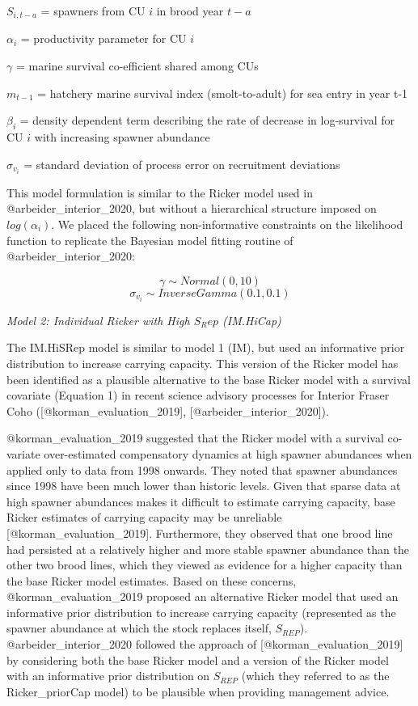 \documentclass[
]{article}
\begin{document}
\(S_{i,t-a}\) = spawners from CU \(i\) in brood year \(t-a\)

\(\alpha_i\) = productivity parameter for CU \(i\)

\(\gamma\) = marine survival co-efficient shared among CUs

\(m_{t-1}\) = hatchery marine survival index (smolt-to-adult) for sea
entry in year t-1

\(\beta_i\) = density dependent term describing the rate of decrease in
log-survival for CU \(i\) with increasing spawner abundance

\(\sigma_{v_i}\) = standard deviation of process error on recruitment
deviations

This model formulation is similar to the Ricker model used in
@arbeider\_interior\_2020, but without a hierarchical structure imposed
on \(log(\alpha_i)\). We placed the following non-informative
constraints on the likelihood function to replicate the Bayesian model
fitting routine of @arbeider\_interior\_2020:

\begin{equation}
  \gamma \sim Normal(0,10)
\end{equation} \begin{equation}
  \sigma_{v_i} \sim Inverse Gamma (0.1,0.1)
\end{equation}

\emph{Model 2: Individual Ricker with High \(S_Rep\) (IM.HiCap)}

The IM.HiSRep model is similar to model 1 (IM), but used an informative
prior distribution to increase carrying capacity. This version of the
Ricker model has been identified as a plausible alternative to the base
Ricker model with a survival covariate (Equation 1) in recent science
advisory processes for Interior Fraser Coho
({[}@korman\_evaluation\_2019{]}, {[}@arbeider\_interior\_2020{]}).

@korman\_evaluation\_2019 suggested that the Ricker model with a
survival co-variate over-estimated compensatory dynamics at high spawner
abundances when applied only to data from 1998 onwards. They noted that
spawner abundances since 1998 have been much lower than historic levels.
Given that sparse data at high spawner abundances makes it difficult to
estimate carrying capacity, base Ricker estimates of carrying capacity
may be unreliable {[}@korman\_evaluation\_2019{]}. Furthermore, they
observed that one brood line had persisted at a relatively higher and
more stable spawner abundance than the other two brood lines, which they
viewed as evidence for a higher capacity than the base Ricker model
estimates. Based on these concerns, @korman\_evaluation\_2019 proposed
an alternative Ricker model that used an informative prior distribution
to increase carrying capacity (represented as the spawner abundance at
which the stock replaces itself, \(S_{REP}\)). @arbeider\_interior\_2020
followed the approach of {[}@korman\_evaluation\_2019{]} by considering
both the base Ricker model and a version of the Ricker model with an
informative prior distribution on \(S_{REP}\) (which they referred to as
the Ricker\_priorCap model) to be plausible when providing management
advice.
\end{document}
